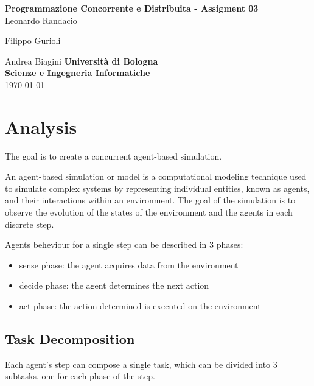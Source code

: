 \documentclass[12pt, a4paper]{report}
\begin{document}
\renewcommand\bibname{References} %


\begin{titlepage}

\begin{center}

\Large \textbf {Programmazione Concorrente e Distribuita - Assigment 03}\\%
\vspace{1em}%
\vfill
Leonardo Randacio


Filippo Gurioli


Andrea Biagini
\vspace{1em}
\vfill
{\bf Università di Bologna \\ Scienze e Ingegneria Informatiche}\\[0.5in]

       
\vfill
\today

\end{center}

\end{titlepage}


\tableofcontents
\listoffigures

\newpage
{} %

\chapter{Analysis}
The goal is to create a concurrent agent-based simulation.

An agent-based simulation or model is a computational modeling
 technique used to simulate complex systems by representing individual
 entities, known as agents, and their interactions within an environment.
 The goal of the simulation is to observe the evolution of the states of the
 environment and the agents in each discrete step.

Agents beheviour for a single step can be described in 3 phases:
\begin{itemize}
   \item sense phase: the agent acquires data from the environment
   \item decide phase: the agent determines the next action
   \item act phase: the action determined is executed on the environment
\end{itemize}

\section{Task Decomposition}
Each agent's step can compose a single task, which can be divided into 3 subtasks,
 one for each phase of the step. 
\end{document}

